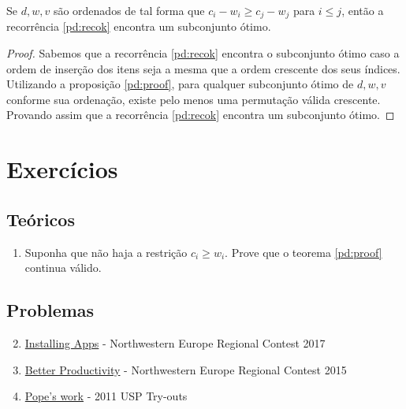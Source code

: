 \begin{lema} \label{pd:impl}
  Se $d, w, v$ são ordenados de tal forma que $c_{i} - w_{i} \geq c_{j} - w_{j}$ para $i \leq j$, então a recorrência \ref{pd:recok} encontra um subconjunto ótimo.
\end{lema}
\begin{proof}
  Sabemos que a recorrência \ref{pd:recok} encontra o subconjunto ótimo caso a ordem de inserção dos itens seja a mesma que a ordem crescente dos seus índices.
  Utilizando a proposição \ref{pd:proof}, para qualquer subconjunto ótimo de $d, w, v$ conforme sua ordenação, existe pelo menos uma permutação válida crescente.
  Provando assim que a recorrência \ref{pd:recok} encontra um subconjunto ótimo.
\end{proof}

\section{Exercícios}

\subsection*{Teóricos}

\begin{enumerate}
  \item Suponha que não haja a restrição $c_i \geq w_i$. Prove que o teorema \ref{pd:proof} continua válido.
\end{enumerate}

\subsection*{Problemas}

\begin{enumerate}
  \setcounter{enumi}{1}
  \item \href{https://open.kattis.com/problems/installingapps}{Installing Apps} - Northwestern Europe Regional Contest 2017
  \item \href{https://icpcarchive.ecs.baylor.edu/index.php?option=com_onlinejudge&Itemid=8&page=show_problem&problem=5446}{Better Productivity} - Northwestern Europe Regional Contest 2015
  \item \href{https://codeforces.com/gym/101081/problem/K}{Pope's work} - 2011 USP Try-outs
\end{enumerate}
